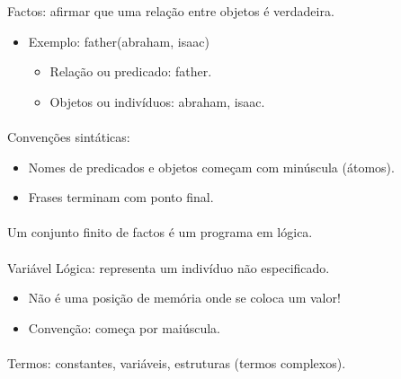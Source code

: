 \documentclass[../resumosPLOG.tex]{subfiles}
\begin{document}
 

Factos: afirmar que uma relação entre objetos é verdadeira.
\begin{itemize}
    \item Exemplo: father(abraham, isaac)
    \begin{itemize}
        \item Relação ou predicado: father.
        \item Objetos ou indivíduos: abraham, isaac.
    \end{itemize}
\end{itemize}

\paragraph{}

Convenções sintáticas:
\begin{itemize}
    \item Nomes de predicados e objetos começam com minúscula (átomos).
    \item Frases terminam com ponto final.
\end{itemize}

\paragraph{}

Um conjunto finito de factos é um programa em lógica.

\paragraph{}

Variável Lógica: representa um indivíduo não especificado.
\begin{itemize}
    \item Não é uma posição de memória onde se coloca um valor!
    \item Convenção: começa por maiúscula.
\end{itemize}

\paragraph{} 

Termos: constantes, variáveis, estruturas (termos complexos).

\paragraph{}
\end{document}
